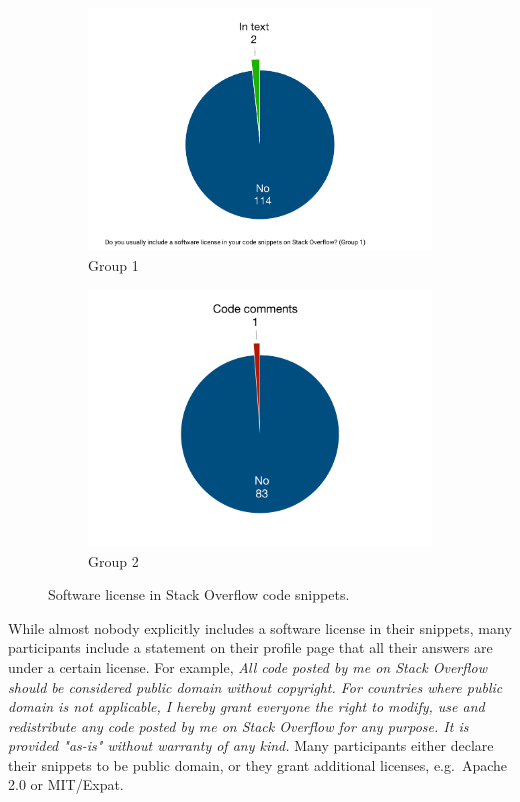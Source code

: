 \documentclass{svjour3}                     %
\begin{document}
\begin{figure}
	\begin{subfigure}{.5\textwidth}
		\centering
		\includegraphics[width=.4\linewidth]{survey_license_1}
		\caption{Group 1}
		\label{fig:survey_license_1}
	\end{subfigure}%
	\begin{subfigure}{.5\textwidth}
		\centering
		\includegraphics[width=.4\linewidth]{survey_license_2}
		\caption{Group 2}
		\label{fig:survey_license_2}
	\end{subfigure}
	\caption{Software license in Stack Overflow code snippets.}
	\label{fig:survey_license}
\end{figure}

While almost nobody explicitly includes a software license in their snippets,
many participants include a statement on their profile page that all their
answers are under a certain license. For example, \textit{All code posted by me on
	Stack Overflow should be considered public domain without copyright. For
	countries where public domain is not applicable, I hereby grant everyone the
	right to modify, use and redistribute any code posted by me on Stack Overflow
	for any purpose. It is provided "as-is" without warranty of any kind.}  Many
participants either declare their snippets to be public domain, or they grant
additional licenses, e.g.\ Apache 2.0 or MIT/Expat.
\end{document}
